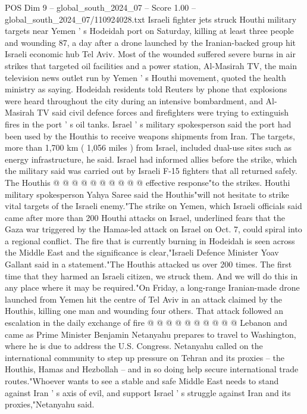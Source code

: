 \begin{textsample}{POS Dim 9 – global\_south\_2024\_07 – Score 1.00 – global\_south\_2024\_07/110924028.txt}  \label{ex:f9_pos_112}
Israeli fighter jets struck Houthi military targets near Yemen ' s Hodeidah port on Saturday, killing at least three people and wounding 87, a day after a drone launched by the Iranian-backed group hit Israeli economic hub Tel Aviv.
Most of the wounded suffered severe burns in air strikes that targeted oil facilities and a power station, Al-Masirah TV, the main television news outlet run by Yemen ' s Houthi movement, quoted the health ministry as saying.
Hodeidah residents told Reuters by phone that explosions were heard throughout the city during an intensive bombardment, and Al-Masirah TV said civil defence forces and firefighters were trying to extinguish fires in the port ' s oil tanks.
Israel ' s military spokesperson said the port had been used by the Houthis to receive weapons shipments from Iran.
The targets, more than 1,700 km ( 1,056 miles ) from Israel, included dual-use sites such as energy infrastructure, he said.
Israel had informed allies before the strike, which the military said was carried out by Israeli F-15 fighters that all returned safely.
The Houthis @ @ @ @ @ @ @ @ @ @ effective response"to the strikes.
Houthi military spokesperson Yahya Saree said the Houthis"will not hesitate to strike vital targets of the Israeli enemy."The strike on Yemen, which Israeli officials said came after more than 200 Houthi attacks on Israel, underlined fears that the Gaza war triggered by the Hamas-led attack on Israel on Oct. 7, could spiral into a regional conflict.
The fire that is currently burning in Hodeidah is seen across the Middle East and the significance is clear,"Israeli Defence Minister Yoav Gallant said in a statement."The Houthis attacked us over 200 times.
The first time that they harmed an Israeli citizen, we struck them.
And we will do this in any place where it may be required."On Friday, a long-range Iranian-made drone launched from Yemen hit the centre of Tel Aviv in an attack claimed by the Houthis, killing one man and wounding four others.
That attack followed an escalation in the daily exchange of fire @ @ @ @ @ @ @ @ @ @ Lebanon and came as Prime Minister Benjamin Netanyahu prepares to travel to Washington, where he is due to address the U.S.
Congress.
Netanyahu called on the international community to step up pressure on Tehran and its proxies -- the Houthis, Hamas and Hezbollah -- and in so doing help secure international trade routes."Whoever wants to see a stable and safe Middle East needs to stand against Iran ' s axis of evil, and support Israel ' s struggle against Iran and its proxies,"Netanyahu said.

\end{textsample}
